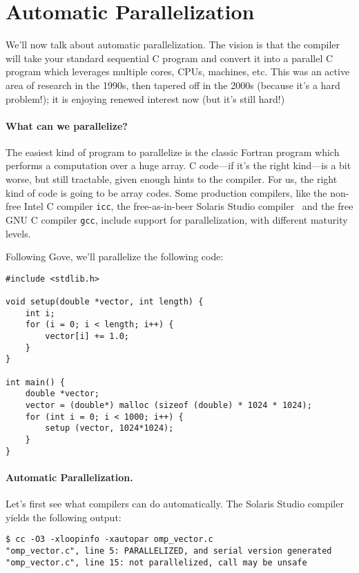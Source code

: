 




\section*{Automatic Parallelization}

We'll now talk about automatic parallelization. The vision is that the compiler will take
your standard sequential C program and convert it into a parallel C
program which leverages multiple cores, CPUs, machines, etc.  This was
an active area of research in the 1990s, then tapered off in the 2000s
(because it's a hard problem!); it is enjoying renewed interest now (but
it's still hard!)

\paragraph{What can we parallelize?} The
easiest kind of program to parallelize is the classic Fortran program
which performs a computation over a huge array. C code---if it's the
right kind---is a bit worse, but still tractable, given enough hints
to the compiler. For us, the right kind of code is going to be array
codes. Some production compilers, like the non-free Intel C compiler
{\tt icc}, the free-as-in-beer Solaris Studio
compiler~\cite{solarisstudio}
and the free GNU C compiler {\tt gcc}, include support for
parallelization, with different maturity levels.


Following Gove, we'll parallelize the following code:

\begin{verbatim}
#include <stdlib.h>

void setup(double *vector, int length) {
    int i;
    for (i = 0; i < length; i++) {
        vector[i] += 1.0;
    }
}

int main() {
    double *vector;
    vector = (double*) malloc (sizeof (double) * 1024 * 1024);
    for (int i = 0; i < 1000; i++) {
        setup (vector, 1024*1024);
    }
}
\end{verbatim}


\paragraph{Automatic Parallelization.} Let's first see what compilers can do automatically.
The Solaris Studio compiler yields the following output:
{\small 
\begin{verbatim}
$ cc -O3 -xloopinfo -xautopar omp_vector.c 
"omp_vector.c", line 5: PARALLELIZED, and serial version generated
"omp_vector.c", line 15: not parallelized, call may be unsafe
\end{verbatim}
} 

